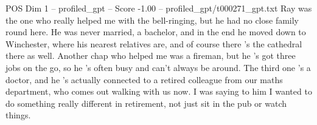 \begin{textsample}{POS Dim 1 – profiled\_gpt – Score -1.00 – profiled\_gpt/t000271\_gpt.txt}  \label{ex:f1_pos_038}
Ray was the one who really helped me with the bell-ringing, but he had no close family round here.
He was never married, a bachelor, and in the end he moved down to Winchester, where his nearest relatives are, and of course there ’s the cathedral there as well.
Another chap who helped me was a fireman, but he ’s got three jobs on the go, so he ’s often busy and can't always be around.
The third one ’s a doctor, and he ’s actually connected to a retired colleague from our maths department, who comes out walking with us now.
I was saying to him I wanted to do something really different in retirement, not just sit in the pub or watch things.

\end{textsample}
